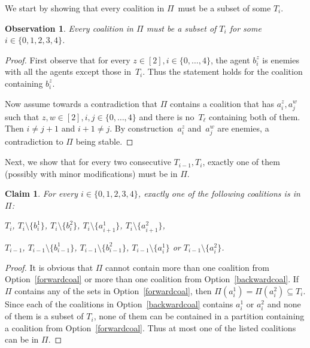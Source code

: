\documentclass[a4paper,fleqn]{cas-sc}
\newcommand{\partition}{\ensuremath{\Pi}\xspace}
\newtheorem{obs}{Observation}
\newtheorem{claim}{Claim}
\begin{document}
{We start by showing that every coalition in \partition\ must be a subset of some $T_i$.
\begin{obs}\label{obs:ticont}
Every coalition in \partition must be a subset of $T_i$ for some $i \in \{0,1,2,3,4\}$. 
\end{obs}
\begin{proof}\renewcommand{\qedsymbol}{$\diamond$}
First observe that for every $z \in [2], i \in \{0,\dots,4\}$, the agent $b^z_i$ is enemies with all the agents except those in~$T_i$. Thus the statement holds for the coalition containing $b^z_i$.

Now assume towards a contradiction that \partition contains a coalition that has $a^z_i, a^w_j$ such that $z, w \in [2], i, j \in \{0,\dots,4\}$ and there is no~$T_{\ell}$ containing both of them. Then $ i \neq j + 1$ and $i + 1 \neq j$. By construction~$a^z_i$ and~$a^w_j$ are enemies, a contradiction to \partition being stable.
\end{proof}

Next, we show that for every two consecutive $T_{i-1}, T_{i}$, exactly one of them (possibly with minor modifications) must be in \partition.
\begin{claim}\label{clm:trianglecoals}
For every $i \in \{0,1,2,3,4\}$, exactly one of the following coalitions is in $\partition$:
\begin{compactenum}
\item $T_i$, $T_i \setminus \{b^1_i\}$, $T_i \setminus \{b^2_i\}$, $T_i \setminus \{a^1_{i + 1}\}$, $T_i \setminus \{a^2_{i + 1}\}$,\label{forwardcoal}
\item $T_{i - 1}$, $T_{i - 1} \setminus \{b^1_{i - 1}\}$, $T_{i - 1} \setminus \{b^2_{i - 1}\}$, $T_{i - 1} \setminus \{a^1_{i}\}$ or $T_{i - 1} \setminus \{a^2_{i}\}$.\label{backwardcoal}
\end{compactenum}
\end{claim}
\begin{proof}\renewcommand{\qedsymbol}{$\diamond$}
It is obvious that \partition cannot contain more than one coalition from Option~\eqref{forwardcoal} or more than one coalition from Option~\eqref{backwardcoal}.
If~\partition contains any of the sets in Option~\eqref{forwardcoal}, then $\Pi(a^1_i) = \Pi(a^2_i) \subseteq T_i$.
Since each of the coalitions in Option~\eqref{backwardcoal} contains $a^1_i$ or $a^2_i$ and none of them is a subset of $T_i$, none of them can be contained in a partition containing a coalition from Option~\eqref{forwardcoal}.
Thus at most one of the listed coalitions can be in \partition.


\end{proof}}
\end{document}
